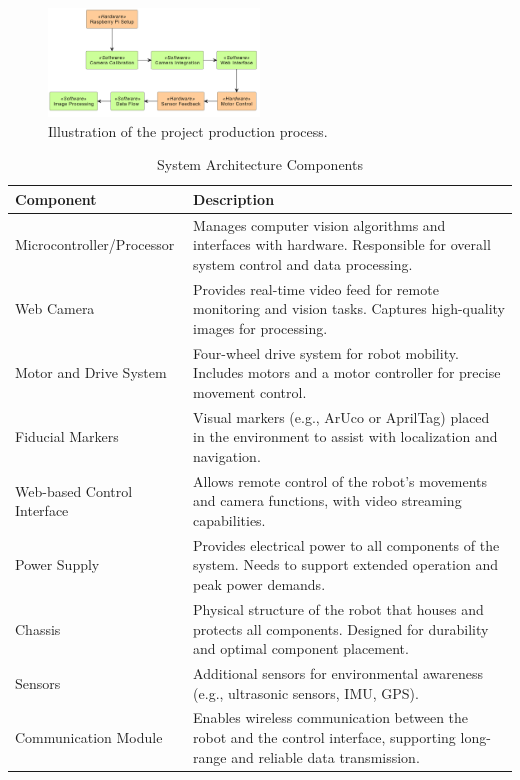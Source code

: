 \begin{figure}[H]
	\centering
	
	\centering
	\includegraphics[width=0.5\textwidth]{ch4/figs/hi.png}
	\caption{Illustration of the project production process.}
	\label{fig:moto}
\end{figure}

\begin{table}[ht]
\centering
\caption{System Architecture Components}
\label{tab:system_architecture}
\begin{tabular}{|p{5cm}|p{10cm}|}
	\hline
	\textbf{Component}          & \textbf{Description}                                                                                                              \\ \hline
	Microcontroller/Processor   & Manages computer vision algorithms and interfaces with hardware. Responsible for overall system control and data processing.      \\ \hline
	Web Camera                  & Provides real-time video feed for remote monitoring and vision tasks. Captures high-quality images for processing.                \\ \hline
	Motor and Drive System      & Four-wheel drive system for robot mobility. Includes motors and a motor controller for precise movement control.                  \\ \hline
	Fiducial Markers            & Visual markers (e.g., ArUco or AprilTag) placed in the environment to assist with localization and navigation.                    \\ \hline
	Web-based Control Interface & Allows remote control of the robot’s movements and camera functions, with video streaming capabilities.                           \\ \hline
	Power Supply                & Provides electrical power to all components of the system. Needs to support extended operation and peak power demands.            \\ \hline
	Chassis                     & Physical structure of the robot that houses and protects all components. Designed for durability and optimal component placement. \\ \hline
	Sensors                     & Additional sensors for environmental awareness (e.g., ultrasonic sensors, IMU, GPS).                                              \\ \hline
	Communication Module        & Enables wireless communication between the robot and the control interface, supporting long-range and reliable data transmission. \\ \hline
\end{tabular}
\end{table}
